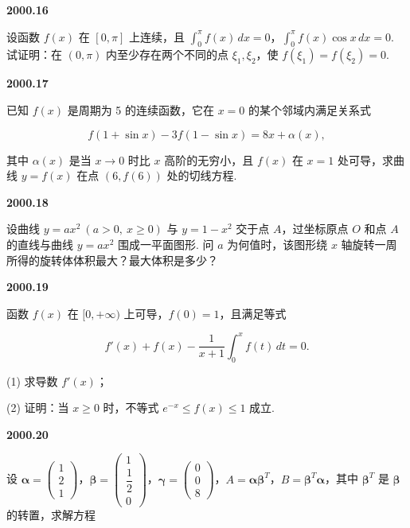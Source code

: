 \documentclass[UTF8,12pt,fontset=windows]{ctexart}
\begin{document}
\vfill
\newpage
{\large\bfseries 2000.16}

设函数 $f(x)$ 在 $[0,\pi]$ 上连续，且 $\int_0^\pi f(x) \, dx = 0$，$\int_0^\pi f(x)\cos x \, dx = 0$. 试证明：在 $(0,\pi)$ 内至少存在两个不同的点 $\xi_1, \xi_2$，使 $f(\xi_1) = f(\xi_2) = 0$.

\vfill
\newpage
{\large\bfseries 2000.17}

已知 $f(x)$ 是周期为 5 的连续函数，它在 $x = 0$ 的某个邻域内满足关系式

$$f(1 + \sin x) - 3f(1 - \sin x) = 8x + \alpha(x),$$

其中 $\alpha(x)$ 是当 $x \to 0$ 时比 $x$ 高阶的无穷小，且 $f(x)$ 在 $x = 1$ 处可导，求曲线 $y = f(x)$ 在点 $(6, f(6))$ 处的切线方程.

\vfill
\newpage
{\large\bfseries 2000.18}

设曲线 $y = ax^2 \ (a > 0,\ x \geqslant 0)$ 与 $y = 1 - x^2$ 交于点 $A$，过坐标原点 $O$ 和点 $A$ 的直线与曲线 $y = ax^2$ 围成一平面图形. 问 $a$ 为何值时，该图形绕 $x$ 轴旋转一周所得的旋转体体积最大？最大体积是多少？

\vfill
\newpage
{\large\bfseries 2000.19}

函数 $f(x)$ 在 $[0, +\infty)$ 上可导，$f(0) = 1$，且满足等式

$$f'(x) + f(x) - \frac{1}{x + 1}\int_0^x f(t) \, dt = 0.$$

(1) 求导数 $f'(x)$；

(2) 证明：当 $x \geqslant 0$ 时，不等式 $e^{-x} \leqslant f(x) \leqslant 1$ 成立.

\vfill
\newpage
{\large\bfseries 2000.20}

设 $\boldsymbol{\alpha} = \begin{pmatrix} 1 \\ 2 \\ 1 \end{pmatrix}$，$\boldsymbol{\beta} = \begin{pmatrix} 1 \\ \dfrac{1}{2} \\ 0 \end{pmatrix}$，$\boldsymbol{\gamma} = \begin{pmatrix} 0 \\ 0 \\ 8 \end{pmatrix}$，$A = \boldsymbol{\alpha}\boldsymbol{\beta}^T$，$B = \boldsymbol{\beta}^T\boldsymbol{\alpha}$，其中 $\boldsymbol{\beta}^T$ 是 $\boldsymbol{\beta}$ 的转置，求解方程
\end{document}
